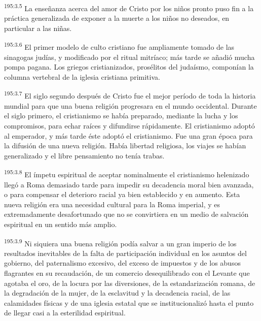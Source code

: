 \par 
\textsuperscript{195:3.5} La enseñanza acerca del amor de Cristo por los niños pronto puso fin a la práctica generalizada de exponer a la muerte a los niños no deseados, en particular a las niñas.

\par 
\textsuperscript{195:3.6} El primer modelo de culto cristiano fue ampliamente tomado de las sinagogas judías, y modificado por el ritual mitríaco; más tarde se añadió mucha pompa pagana. Los griegos cristianizados, prosélitos del judaísmo, componían la columna vertebral de la iglesia cristiana primitiva.

\par 
\textsuperscript{195:3.7} El siglo segundo después de Cristo fue el mejor período de toda la historia mundial para que una buena religión progresara en el mundo occidental. Durante el siglo primero, el cristianismo se había preparado, mediante la lucha y los compromisos, para echar raíces y difundirse rápidamente. El cristianismo adoptó al emperador, y más tarde éste adoptó el cristianismo. Fue una gran época para la difusión de una nueva religión. Había libertad religiosa, los viajes se habían generalizado y el libre pensamiento no tenía trabas.

\par 
\textsuperscript{195:3.8} El ímpetu espiritual de aceptar nominalmente el cristianismo helenizado llegó a Roma demasiado tarde para impedir su decadencia moral bien avanzada, o para compensar el deterioro racial ya bien establecido y en aumento. Esta nueva religión era una necesidad cultural para la Roma imperial, y es extremadamente desafortunado que no se convirtiera en un medio de salvación espiritual en un sentido más amplio.

\par 
\textsuperscript{195:3.9} Ni siquiera una buena religión podía salvar a un gran imperio de los resultados inevitables de la falta de participación individual en los asuntos del gobierno, del paternalismo excesivo, del exceso de impuestos y de los abusos flagrantes en su recaudación, de un comercio desequilibrado con el Levante que agotaba el oro, de la locura por las diversiones, de la estandarización romana, de la degradación de la mujer, de la esclavitud y la decadencia racial, de las calamidades físicas y de una iglesia estatal que se institucionalizó hasta el punto de llegar casi a la esterilidad espiritual.

